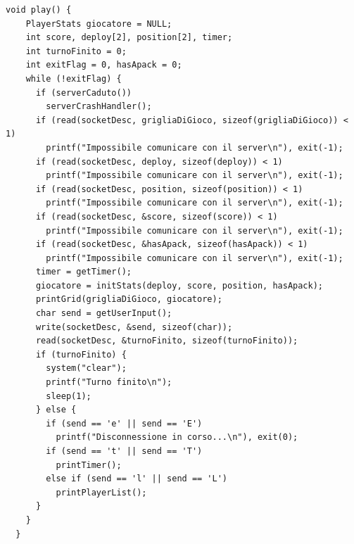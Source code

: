 \documentclass[a4paper]{article}
\begin{document}
\pagebreak
\begin{lstlisting}[caption=Funzione play del client, label=alg:playclient]
  void play() {
    PlayerStats giocatore = NULL;
    int score, deploy[2], position[2], timer;
    int turnoFinito = 0;
    int exitFlag = 0, hasApack = 0;
    while (!exitFlag) {
      if (serverCaduto())
        serverCrashHandler();
      if (read(socketDesc, grigliaDiGioco, sizeof(grigliaDiGioco)) < 1)
        printf("Impossibile comunicare con il server\n"), exit(-1);
      if (read(socketDesc, deploy, sizeof(deploy)) < 1)
        printf("Impossibile comunicare con il server\n"), exit(-1);
      if (read(socketDesc, position, sizeof(position)) < 1)
        printf("Impossibile comunicare con il server\n"), exit(-1);
      if (read(socketDesc, &score, sizeof(score)) < 1)
        printf("Impossibile comunicare con il server\n"), exit(-1);
      if (read(socketDesc, &hasApack, sizeof(hasApack)) < 1)
        printf("Impossibile comunicare con il server\n"), exit(-1);
      timer = getTimer();
      giocatore = initStats(deploy, score, position, hasApack);
      printGrid(grigliaDiGioco, giocatore);
      char send = getUserInput();
      write(socketDesc, &send, sizeof(char));
      read(socketDesc, &turnoFinito, sizeof(turnoFinito));
      if (turnoFinito) {
        system("clear");
        printf("Turno finito\n");
        sleep(1);
      } else {
        if (send == 'e' || send == 'E')
          printf("Disconnessione in corso...\n"), exit(0);
        if (send == 't' || send == 'T')
          printTimer();
        else if (send == 'l' || send == 'L')
          printPlayerList();
      }
    }
  }    
\end{lstlisting}
\lstlistoflistings
\end{document}
